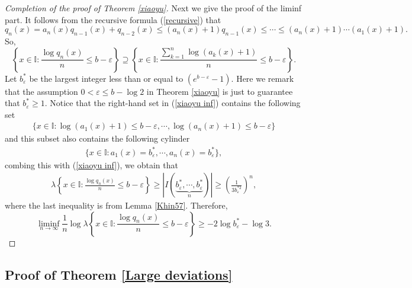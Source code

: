 \documentclass[reqno]{amsart}
\theoremstyle{definition}
\numberwithin{equation}{section}
\begin{document}
\begin{proof}[Completion of the proof of Theorem \ref{xiaoyu}]
Next we give the proof of the liminf part. It follows from the recursive formula (\ref{recursive}) that
\[
q_n(x)= a_n(x) q_{n-1}(x) + q_{n-2}(x) \leq (a_n(x)+1) q_{n-1}(x)\leq \cdots \leq (a_n(x)+1)\cdots(a_1(x)+1).
\]
So,
\begin{equation}\label{xiaoyu inf}
\left\{x \in \mathbb{I}: \frac{\log q_n(x)}{n} \leq b - \varepsilon\right\} \supseteq
\left\{x \in \mathbb{I}:\frac{\sum_{k=1}^n \log (a_k(x)+1)}{n} \leq b - \varepsilon\right\}.
\end{equation}
Let $b^\ast_\varepsilon$ be the largest integer less than or equal to $(e^{b -\varepsilon} -1)$. Here we remark that the assumption $0<\varepsilon \leq b- \log 2$ in Theorem \ref{xiaoyu} is just to guarantee that $b^\ast_\varepsilon \geq 1$.
Notice that the right-hand set in (\ref{xiaoyu inf}) contains the following set
\begin{align*}
 \Big\{x \in \mathbb{I}: \log (a_1(x)+1) \leq b - \varepsilon , \cdots, \log (a_n(x)+1) \leq b - \varepsilon\Big\}
\end{align*}
and this subset also contains the following cylinder
\begin{align*}
\Big\{x \in \mathbb{I}:a_1(x) = b^\ast_\varepsilon, \cdots, a_n(x)= b^\ast _\varepsilon\Big\},
\end{align*}
combing this with (\ref{xiaoyu inf}), we obtain that
\begin{align*}
\lambda \left\{x \in \mathbb{I}: \frac{\log q_n(x)}{n} \leq b - \varepsilon\right\} \geq
|I(\underbrace{b^\ast_\varepsilon, \cdots,b^\ast_\varepsilon}_{n})| \geq \left(\frac{1}{3b_\varepsilon^{\ast 2}}\right)^n,
\end{align*}
where the last inequality is from Lemma \ref{Khin57}. Therefore,
\[
\liminf_{n \to \infty} \frac{1}{n}\log \lambda \left\{x \in \mathbb{I}:\frac{\log q_n(x)}{n} \leq b - \varepsilon\right\} \geq - 2\log b^\ast_\varepsilon -\log 3.
\]
\end{proof}

\subsection{Proof of Theorem \ref{Large deviations}}
\end{document}
